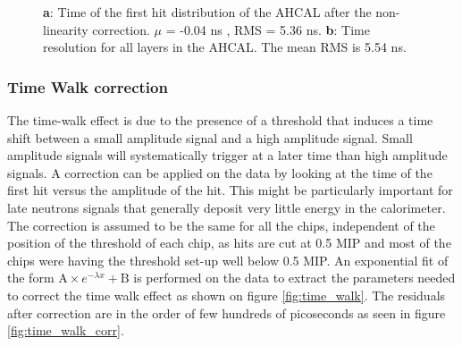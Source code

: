 \documentclass[twoside,a4paper,11pt]{article}
\begin{document}
\begin{figure}[htbp]
	\hfill
	\hfill
\caption[]{\textbf{a}: Time of the first hit distribution of the AHCAL after the non-linearity correction. $\mu$ = -0.04 ns , RMS = 5.36 ns. \textbf{b}: Time resolution for all layers in the AHCAL. The mean RMS is 5.54 ns.}
\end{figure}

\subsubsection{Time Walk correction}
\label{subsec:timewalk}

The time-walk effect is due to the presence of a threshold that induces a time shift between a small amplitude signal and a high amplitude signal. Small amplitude signals will systematically trigger at a later time than high amplitude signals. A correction can be applied on the data by looking at the time of the first hit versus the amplitude of the hit. This might be particularly important for late neutrons signals that generally deposit very little energy in the calorimeter. The correction is assumed to be the same for all the chips, independent of the position of the threshold of each chip, as hits are cut at 0.5 MIP and most of the chips were having the threshold set-up well below 0.5 MIP. An exponential fit of the form $\text{A} \times e^{-\lambda{}x} + \text{B}$ is performed on the data to extract the parameters needed to correct the time walk effect as shown on figure \ref{fig:time_walk}. The residuals after correction are in the order of few hundreds of picoseconds as seen in figure \ref{fig:time_walk_corr}.
\end{document}
